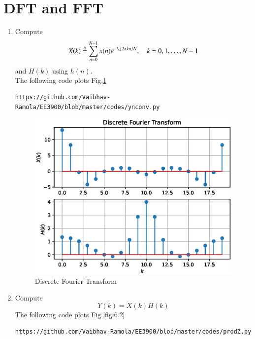 \documentclass[journal,12pt,twocolumn]{IEEEtran}
\renewcommand\thesection{\arabic{section}}
\begin{document}
\section{DFT and FFT}
\begin{enumerate}[label=\thesection.\arabic*]
\item
Compute
\begin{equation}
	X(k) \define \sum _{n=0}^{N-1}x(n) e^{-\j2\pi kn/N}, \quad k = 0,1,\dots, N-1
\end{equation}
and $H(k)$ using $h(n)$. \\
\solution
The following code plots Fig.\ref{fig:6.1} 
\begin{lstlisting}
https://github.com/Vaibhav-Ramola/EE3900/blob/master/codes/ynconv.py
\end{lstlisting}
\begin{figure}[!ht]
	\centering
	\includegraphics[width=\columnwidth]{figs/dft}
	\caption{Discrete Fourier Transform}
	\label{fig:6.1}
\end{figure}
\item Compute 
\begin{equation}
	Y(k) = X(k)H(k)
\end{equation}
\solution
The following code plots Fig.\ref{fig:6.2}
\begin{lstlisting}
https://github.com/Vaibhav-Ramola/EE3900/blob/master/codes/prodZ.py
\end{lstlisting}
\begin{figure}[!ht]
	\centering

\end{figure}
\end{enumerate}
\end{document}
